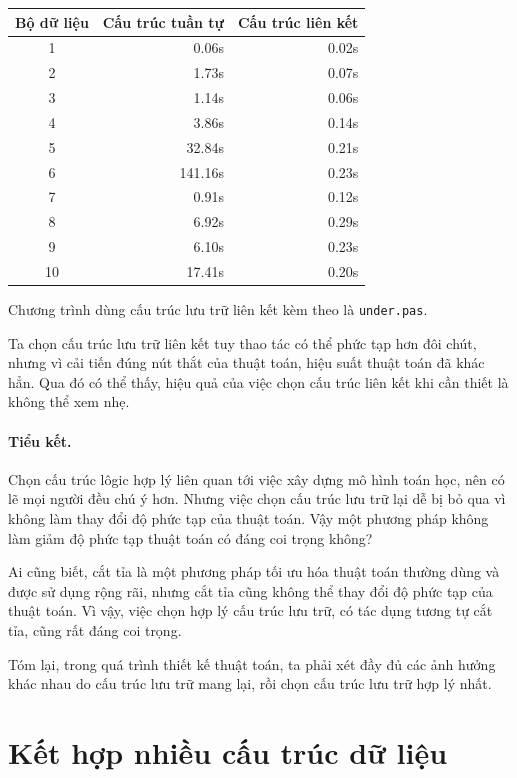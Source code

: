 \documentclass[11pt]{article}
\begin{document}
\begin{center}
\begin{tabular}{c r r}
\hline
Bộ dữ liệu & Cấu trúc tuần tự & Cấu trúc liên kết\\
\hline
1 & 0.06s & 0.02s\\
2 & 1.73s & 0.07s\\
3 & 1.14s & 0.06s\\
4 & 3.86s & 0.14s\\
5 & 32.84s & 0.21s\\
6 & 141.16s & 0.23s\\
7 & 0.91s & 0.12s\\
8 & 6.92s & 0.29s\\
9 & 6.10s & 0.23s\\
10 & 17.41s & 0.20s\\
\hline
\end{tabular}
\end{center}

Chương trình dùng cấu trúc lưu trữ liên kết kèm theo là \texttt{under.pas}.

Ta chọn cấu trúc lưu trữ liên kết tuy thao tác có thể phức tạp hơn đôi chút,
nhưng vì cải tiến đúng nút thắt của thuật toán, hiệu suất thuật toán đã khác
hẳn. Qua đó có thể thấy, hiệu quả của việc chọn cấu trúc liên kết khi cần
thiết là không thể xem nhẹ.

\paragraph{Tiểu kết.}
Chọn cấu trúc lôgic hợp lý liên quan tới việc xây dựng mô hình toán học, nên
có lẽ mọi người đều chú ý hơn. Nhưng việc chọn cấu trúc lưu trữ lại dễ bị bỏ
qua vì không làm thay đổi độ phức tạp của thuật toán. Vậy một phương pháp
không làm giảm độ phức tạp thuật toán có đáng coi trọng không?

Ai cũng biết, cắt tỉa là một phương pháp tối ưu hóa thuật toán thường dùng và
được sử dụng rộng rãi, nhưng cắt tỉa cũng không thể thay đổi độ phức tạp của
thuật toán. Vì vậy, việc chọn hợp lý cấu trúc lưu trữ, có tác dụng tương tự
cắt tỉa, cũng rất đáng coi trọng.

Tóm lại, trong quá trình thiết kế thuật toán, ta phải xét đầy đủ các ảnh
hưởng khác nhau do cấu trúc lưu trữ mang lại, rồi chọn cấu trúc lưu trữ hợp
lý nhất.

\section{Kết hợp nhiều cấu trúc dữ liệu}
\end{document}
